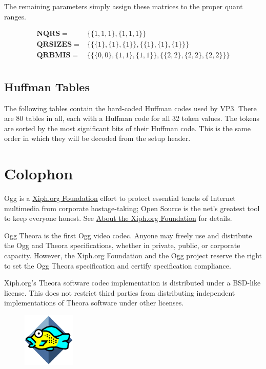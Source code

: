 \documentclass[9pt,letterpaper]{book}
\newcommand{\bitvar}[1]{\ensuremath{\mathbf{\bm{#1}}}}
\numberwithin{equation}{chapter}
\numberwithin{figure}{chapter}
\numberwithin{table}{chapter}
\begin{document}
The remaining parameters simply assign these matrices to the proper quant
 ranges.

\begin{align*}
\bitvar{NQRS}    = & \{ \{1, 1, 1\}, \{1, 1, 1\} \} \\
\bitvar{QRSIZES} = &
 \{ \{ \{1\}, \{1\}, \{1\} \}, \{ \{1\}, \{1\}, \{1\} \} \} \\
\bitvar{QRBMIS}  = &
 \{ \{ \{0, 0\}, \{1, 1\}, \{1, 1\} \}, \{ \{2, 2\}, \{2, 2\}, \{2, 2\} \} \} \\
\end{align*}

\section{Huffman Tables}
\label{app:vp3-huffman-tables}

The following tables contain the hard-coded Huffman codes used by VP3.
There are 80 tables in all, each with a Huffman code for all 32 token values.
The tokens are sorted by the most significant bits of their Huffman code.
This is the same order in which they will be decoded from the setup header.



\cleardoublepage
\chapter{Colophon}

Ogg is a \href{http://www.xiph.org}{Xiph.org Foundation} effort to protect
 essential tenets of Internet multimedia from corporate hostage-taking; Open
 Source is the net's greatest tool to keep everyone honest.
See \href{http://www.xiph.org/about.html}{About the Xiph.org Foundation} for
 details.

Ogg Theora is the first Ogg video codec.
Anyone may freely use and distribute the Ogg and Theora specifications, whether
 in private, public, or corporate capacity.
However, the Xiph.org Foundation and the Ogg project reserve the right to set
 the Ogg Theora specification and certify specification compliance.

Xiph.org's Theora software codec implementation is distributed under a BSD-like
 license.
This does not restrict third parties from distributing independent
 implementations of Theora software under other licenses.

\begin{figure}
\includegraphics[width=2.5cm]{xifish}
\end{figure}
\end{document}
